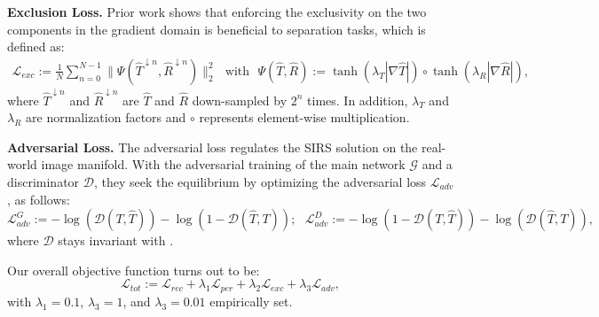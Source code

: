 \documentclass{article}
\begin{document}
\par \noindent \textbf{Exclusion Loss.} Prior work \cite{DBLP:journals/tog/Freeman15,DBLP:conf/cvpr/ZhangNC18a} shows that enforcing the exclusivity on the two components in the gradient domain is beneficial to separation tasks, which is defined as: 
\begin{equation}
\begin{aligned}
    \mathcal{L}_{exc} := \frac{1}{N} \sum_{n=0}^{N-1} \|\Psi(\hat{T}^{\downarrow n}, \hat{R}^{\downarrow n})\|_2^2\ \ \ \text{with} \ \ \ \Psi(\hat{T}, \hat{R}):=\tanh \left(\lambda_{T}|\nabla \hat{T}|\right) \circ \tanh \left(\lambda_{R}|\nabla \hat{R}|\right),
\end{aligned}
\end{equation}
where $\hat{T}^{\downarrow n}$ and $\hat{R}^{\downarrow n}$ are $\hat{T}$ and $\hat{R}$ down-sampled by $2^n$ times. In addition, $\lambda_T$ and $\lambda_R$ are normalization factors and $\circ$ represents element-wise multiplication. 

\par \noindent \textbf{Adversarial Loss.} 
The adversarial loss regulates the SIRS solution on the real-world image manifold. With the adversarial training of the main network $\mathcal{G}$ and a discriminator $\mathcal{D}$, they seek the equilibrium by optimizing the adversarial loss $\mathcal{L}_{adv}$ \cite{DBLP:conf/iclr/Jolicoeur-Martineau19}, as follows: 
\begin{equation}
\mathcal{L}_{adv}^{G}:=-\log (\mathcal{D}(T, \hat{T}))-\log (1-\mathcal{D}(\hat{T}, T));\ \ \ \mathcal{L}_{adv}^{D}:=-\log (1-\mathcal{D}(T, \hat{T}))-\log (\mathcal{D}(\hat{T}, T)),
\end{equation}
where $\mathcal{D}$ stays invariant with \cite{DBLP:conf/cvpr/WeiYFW019}. 

Our overall objective function turns out to be:
\begin{equation}
    \mathcal{L}_{tot} := \mathcal{L}_{rec} + \lambda_1 \mathcal{L}_{per} + \lambda_2 \mathcal{L}_{exc} + \lambda_3 \mathcal{L}_{adv},
\end{equation}
with $\lambda_1 = 0.1$, $\lambda_3 = 1$, and $\lambda_3 = 0.01$ empirically set.
\end{document}
